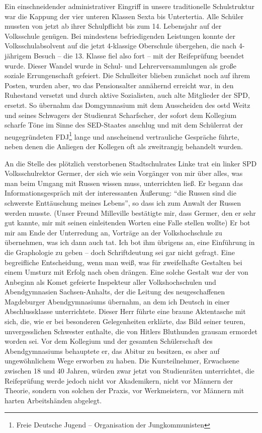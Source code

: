 Ein einschneidender administrativer Eingriff in unsere traditionelle Schulstruktur war die Kappung der vier unteren Klassen Sexta bis Untertertia. Alle Schüler mussten von jetzt ab ihrer Schulpflicht bis zum 14. Lebensjahr auf der Volksschule genügen. Bei mindestens befriedigenden Leistungen konnte der Volksschulabsolvent auf die jetzt 4-klassige Oberschule übergehen, die nach 4-jährigem Besuch -- die 13. Klasse fiel also fort -- mit der Reifeprüfung beendet wurde. Dieser Wandel wurde in Schul- und Lehrerversammlungen als große soziale Errungenschaft gefeiert. Die Schulleiter blieben zunächst noch auf ihrem Posten, wurden aber, wo das Pensionsalter annähernd erreicht war, in den Ruhestand versetzt und durch aktive Sozialisten, auch alte Mitglieder der SPD, ersetzt. So übernahm das Domgymnasium mit dem Ausscheiden des \ac{ostd} Weitz und seines Schwagers der Studienrat Scharfscher, der sofort dem Kollegium  scharfe Töne im Sinne des SED-Staates anschlug und mit dem Schülerrat der neugegründeten FDJ\footnote{Freie Deutsche Jugend -- Organisation der Jungkommunisten} lange und anscheinend vertrauliche Gespräche führte, neben denen die Anliegen der Kollegen oft als zweitrangig behandelt wurden.

An die Stelle des plötzlich verstorbenen Stadtschulrates Linke trat ein linker SPD Volksschulrektor Germer, der sich wie sein Vorgänger von mir über alles, was man beim Umgang mit Russen wissen muss, unterrichten ließ. Er begann das Informationsgespräch mit der interessanten Äußerung: \enquote{die Russen sind die schwerste Enttäuschung meines Lebens}, so dass ich zum Anwalt der Russen werden musste. (Unser Freund Milleville bestätigte mir, dass Germer, den er sehr gut kannte, mir mit seinen einleitenden Worten eine Falle stellen wollte) Er bot mir am Ende der Unterredung an, Vorträge an der Volkshochschule zu übernehmen, was ich dann auch tat. Ich bot ihm übrigens an, eine Einführung in die Graphologie zu geben -- doch Schriftdeutung sei gar nicht gefragt. Eine begreifliche Entscheidung, wenn man weiß, was für zweifelhafte Gestalten bei einem Umsturz mit Erfolg nach oben drängen. Eine solche Gestalt war der von Anbeginn als Komet gefeierte Inspekteur aller Volkshochschulen und Abendgymnasien Sachsen-Anhalts, der  die Leitung des neugeschaffenen Magdeburger Abendgymnasiums übernahm, an dem ich Deutsch in einer Abschlussklasse unterrichtete. Dieser Herr führte eine braune Aktentasche mit sich, die, wie er bei besonderen Gelegenheiten erklärte, das Bild seiner teuren, unvergesslichen Schwester enthalte, die von Hitlers Bluthunden grausam ermordet worden sei. Vor dem Kollegium und der gesamten Schülerschaft des Abendgymnasiums behauptete er, das Abitur zu besitzen, es aber auf ungewöhnlichem Wege erworben zu haben. Die Kursteilnehmer, Erwachsene zwischen 18 und 40 Jahren, würden zwar jetzt von Studienräten unterrichtet, die Reifeprüfung werde jedoch nicht vor Akademikern, nicht vor Männern der Theorie, sondern von solchen der Praxis, vor Werkmeistern, vor Männern mit harten Arbeitshänden abgelegt.

